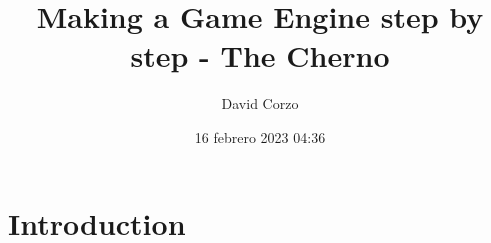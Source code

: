 \documentclass[openany]{book}
\title{Making a Game Engine step by step - The Cherno}
\date{16 febrero 2023 04:36}
\author{David Corzo}
\begin{document}
\maketitle
\tableofcontents

\chapter{Introduction}


\end{document}
